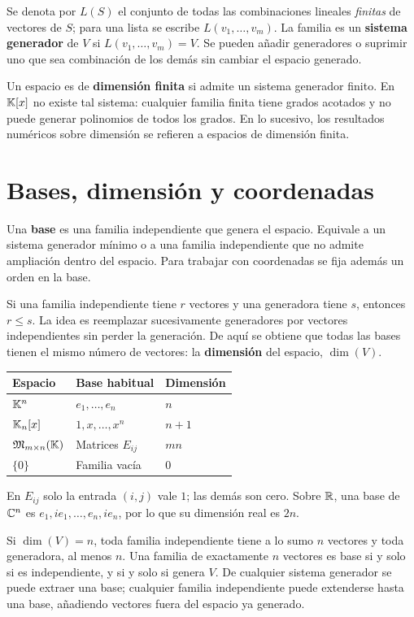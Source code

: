 Se denota por $L(S)$ el conjunto de todas las combinaciones lineales
\emph{finitas} de vectores de $S$; para una lista se escribe
$L(v_1,\ldots,v_m)$. La familia es un \textbf{sistema generador} de $V$
si $L(v_1,\ldots,v_m)=V$. Se pueden añadir generadores o suprimir uno
que sea combinación de los demás sin cambiar el espacio generado.

Un espacio es de \textbf{dimensión finita} si admite un sistema generador
finito. En $\mathbb{K}[x]$ no existe tal sistema: cualquier familia finita
tiene grados acotados y no puede generar polinomios de todos los grados.
En lo sucesivo, los resultados numéricos sobre dimensión se refieren
a espacios de dimensión finita.

\section{Bases, dimensión y coordenadas}
\label{sec:bases}

Una \textbf{base} es una familia independiente que genera el espacio.
Equivale a un sistema generador mínimo o a una familia independiente
que no admite ampliación dentro del espacio. Para trabajar con coordenadas
se fija además un orden en la base.

Si una familia independiente tiene $r$ vectores y una generadora tiene $s$,
entonces $r\le s$. La idea es reemplazar sucesivamente generadores por
vectores independientes sin perder la generación. De aquí se obtiene
que todas las bases tienen el mismo número de vectores: la
\textbf{dimensión} del espacio, $\dim(V)$.

\begin{center}
\begin{tabular}{@{}lll@{}}
\toprule
Espacio & Base habitual & Dimensión \\
\midrule
$\mathbb{K}^n$ & $e_1,\ldots,e_n$ & $n$ \\
$\mathbb{K}_n[x]$ & $1,x,\ldots,x^n$ & $n+1$ \\
$\mathfrak{M}_{m\times n}(\mathbb{K})$ & Matrices $E_{ij}$ & $mn$ \\
$\{0\}$ & Familia vacía & $0$ \\
\bottomrule
\end{tabular}
\end{center}
En $E_{ij}$ solo la entrada $(i,j)$ vale $1$; las demás son cero.
Sobre $\mathbb{R}$, una base de $\mathbb{C}^n$ es $e_1,ie_1,\ldots,e_n,ie_n$,
por lo que su dimensión real es $2n$.

Si $\dim(V)=n$, toda familia independiente tiene a lo sumo $n$ vectores
y toda generadora, al menos $n$. Una familia de exactamente $n$ vectores
es base si y solo si es independiente, y si y solo si genera $V$.
De cualquier sistema generador se puede extraer una base; cualquier familia
independiente puede extenderse hasta una base, añadiendo vectores fuera
del espacio ya generado.

